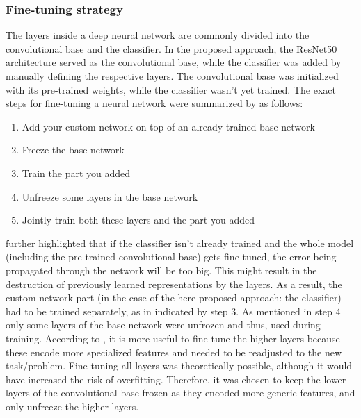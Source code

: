\subsubsection{Fine-tuning strategy}
The layers inside a deep neural network are commonly divided into the convolutional base and the classifier. In the proposed approach, the ResNet50 architecture served as the convolutional base, while the classifier was added by manually defining the respective layers. The convolutional base was initialized with its pre-trained weights, while the classifier wasn't yet trained.
\newline\newline
The exact steps for fine-tuning a neural network were summarized by \citet{Chollet:2017:DeepLearningPython} as follows:
\begin{enumerate}
    \item Add your custom network on top of an already-trained base network
    \item Freeze the base network
    \item Train the part you added
    \item Unfreeze some layers in the base network
    \item Jointly train both these layers and the part you added
\end{enumerate}

\citet{Chollet:2017:DeepLearningPython} further highlighted that if the classifier isn't already trained and the whole model (including the pre-trained convolutional base) gets fine-tuned, the error being propagated through the network will be too big. This might result in the destruction of previously learned representations by the layers. As a result, the custom network part (in the case of the here proposed approach: the classifier) had to be trained separately, as in indicated by step 3. 
\newline\newline
As mentioned in step 4 only some layers of the base network were unfrozen and thus, used during training. According to \citet{Chollet:2017:DeepLearningPython}, it is more useful to fine-tune the higher layers because these encode more specialized features and needed to be readjusted to the new task/problem. Fine-tuning all layers was theoretically possible, although it would have increased the risk of overfitting. Therefore, it was chosen to keep the lower layers of the convolutional base frozen as they encoded more generic features, and only unfreeze the higher layers.

